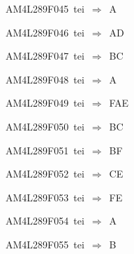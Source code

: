 {\sixrm AM4L289F045\ {\sixit tei}\ }$\Rightarrow$\ A\par\smallskip
{\sixrm AM4L289F046\ {\sixit tei}\ }$\Rightarrow$\ AD\par\smallskip
{\sixrm AM4L289F047\ {\sixit tei}\ }$\Rightarrow$\ BC\par\smallskip
{\sixrm AM4L289F048\ {\sixit tei}\ }$\Rightarrow$\ A\par\smallskip
{\sixrm AM4L289F049\ {\sixit tei}\ }$\Rightarrow$\ FAE\par\smallskip
{\sixrm AM4L289F050\ {\sixit tei}\ }$\Rightarrow$\ BC\par\smallskip
{\sixrm AM4L289F051\ {\sixit tei}\ }$\Rightarrow$\ BF\par\smallskip
{\sixrm AM4L289F052\ {\sixit tei}\ }$\Rightarrow$\ CE\par\smallskip
{\sixrm AM4L289F053\ {\sixit tei}\ }$\Rightarrow$\ FE\par\smallskip
{\sixrm AM4L289F054\ {\sixit tei}\ }$\Rightarrow$\ A\par\smallskip
{\sixrm AM4L289F055\ {\sixit tei}\ }$\Rightarrow$\ B\par\smallskip

